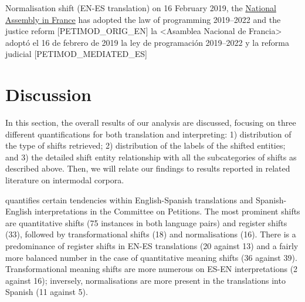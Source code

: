 \documentclass[output=paper]{langscibook}
\begin{document}
\newpage
\ea\label{ex:corpas:9}
Normalisation shift (EN-ES translation)
\ea
on 16 February 2019, the \underline{National Assembly in France} has adopted the law of programming 2019--2022 and the justice reform [PETIMOD\_ORIG\_EN]
\ex
la <Asamblea Nacional de Francia> adoptó el 16 de febrero de 2019 la ley de programación 2019--2022 y la reforma judicial [PETIMOD\_MEDIATED\_ES]
\z
\z



\section{Discussion}\label{sec:corpas:6}

In this section, the overall results of our analysis are discussed, focusing on three different quantifications for both translation and interpreting: 1) distribution of the type of shifts retrieved; 2) distribution of the labels of the shifted entities; and 3) the detailed shift entity relationship with all the subcategories of shifts as described above. Then, we will relate our findings to results reported in related literature on intermodal corpora.

 quantifies certain tendencies within English-Spanish translations and Spanish-English interpretations in the Committee on Petitions. The most prominent shifts are quantitative shifts (75 instances in both language pairs) and register shifts (33), followed by transformational shifts (18) and normalisations (16). There is a predominance of register shifts in EN-ES translations (20 against 13) and a fairly more balanced number in the case of quantitative meaning shifts (36 against 39). Transformational meaning shifts are more numerous on ES-EN interpretations (2 against 16); inversely, normalisations are more present in the translations into Spanish (11 against 5).
\end{document}
